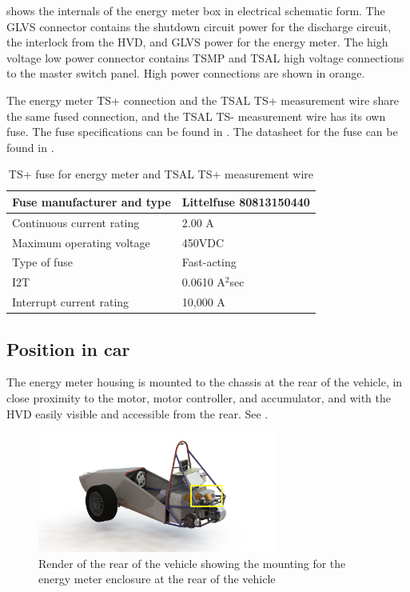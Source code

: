\documentclass{article}
\begin{document}
 shows the internals of the energy meter box in electrical schematic form. The GLVS connector contains the shutdown circuit power for the discharge circuit, the interlock from the HVD, and GLVS power for the energy meter. The high voltage low power connector contains TSMP and TSAL high voltage connections to the master switch panel. High power connections are shown in orange.

The energy meter TS+ connection and the TSAL TS+ measurement wire share the same fused connection, and the TSAL TS- measurement wire has its own fuse. The fuse specifications can be found in . The datasheet for the fuse can be found in .

\begin{table}[H]
	\centering
	\begin{tabular}{|l|l|}
	\hline
	Fuse manufacturer and type & Littelfuse 80813150440 \\ \hline
	Continuous current rating & 2.00 A \\ \hline
	Maximum operating voltage & 450VDC \\ \hline
	Type of fuse & Fast-acting \\ \hline
	I2T & 0.0610 A$^{2}$sec \\ \hline
	Interrupt current rating & 10,000 A \\ \hline
	\end{tabular}
	\caption{TS+ fuse for energy meter and TSAL TS+ measurement wire}
	\label{tab:TSAL_and_EM_fuse}
\end{table}

\subsection{Position in car}
The energy meter housing is mounted to the chassis at the rear of the vehicle, in close proximity to the motor, motor controller, and accumulator, and with the HVD easily visible and accessible from the rear. See .

\begin{figure}[H]
\centering
\includegraphics[width=0.7\textwidth]{Energy_meter_mounting_full_car.png}
\caption{Render of the rear of the vehicle showing the mounting for the energy meter enclosure at the rear of the vehicle}
\label{fig:energy_meter_mounting_render}
\end{figure}
\end{document}
